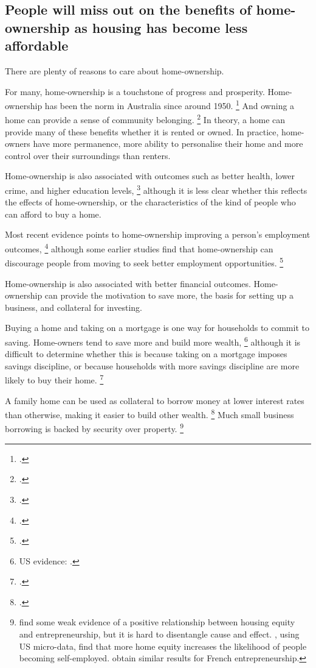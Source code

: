 \subsection{People will miss out on the benefits of home-ownership as housing has become less affordable}\label{subsec:people-will-miss-out-on-the-benefits-of-home-ownership-as-housing-has-become-less-affordable}

There are plenty of reasons to care about home-ownership.

For many, home-ownership is a touchstone of progress and prosperity.
Home-ownership has been the norm in Australia since around 1950.%
	\footcite[][7]{KellyHarrisonHunterEtAl2013}
And owning a home can provide a sense of community belonging.%
	\footcite{KellyHarrisonHunterEtAl2013}
In theory, a home can provide many of these benefits whether it is rented or owned.
In practice, home-owners have more permanence, more ability to personalise their home and more control over their surroundings than renters.

Home-ownership is also associated with outcomes such as better health, lower crime, and higher education levels,%
	\footcite{WaldegraveUrbanova2016}
although it is less clear whether this reflects the effects of home-ownership, or the characteristics of the kind of people who can afford to buy a home.

Most recent evidence points to home-ownership improving a person's employment outcomes,%
	\footcites{Munch-etal-2006-Are-homeowners-really-more-unemployed}{WaldegraveUrbanova2016}{Kantoretal2015homeownership}
although some earlier studies find that home-ownership can discourage people from moving to seek better employment opportunities.%
	\footcite{Oswald-1999-Housing-market-and-Europes-unemployment}

Home-ownership is also associated with better financial outcomes.
Home-ownership can provide the motivation to save more, the basis for setting up a business, and collateral for investing. 

Buying a home and taking on a mortgage is one way for households to commit to saving.
Home-owners tend to save more and build more wealth,%
	\footnote{US evidence: \textcites{Dietal2007}{TurnerLuea2009}.}
although it is difficult to determine whether this is because taking on a mortgage imposes savings discipline, or because households with more savings discipline are more likely to buy their home.%
	\footcites{Dietal2007}{TurnerLuea2009}{DietzandHaurin2003}

A family home can be used as collateral to borrow money at lower interest rates than otherwise, making it easier to build other wealth.%
	\footcite[][126]{Connollyetal2015}
Much small business borrowing is backed by security over property.%
	\footnote{\textcite[][126--142]{Connollyetal2015} find some weak evidence of a positive relationship between housing equity and entrepreneurship, but it is hard to disentangle cause and effect. \textcite{CorradinPopov2015}, using US micro-data, find that more home equity increases the likelihood of people becoming self-employed.
	\textcite{Schmalzetal2017} obtain similar results for French entrepreneurship.}

